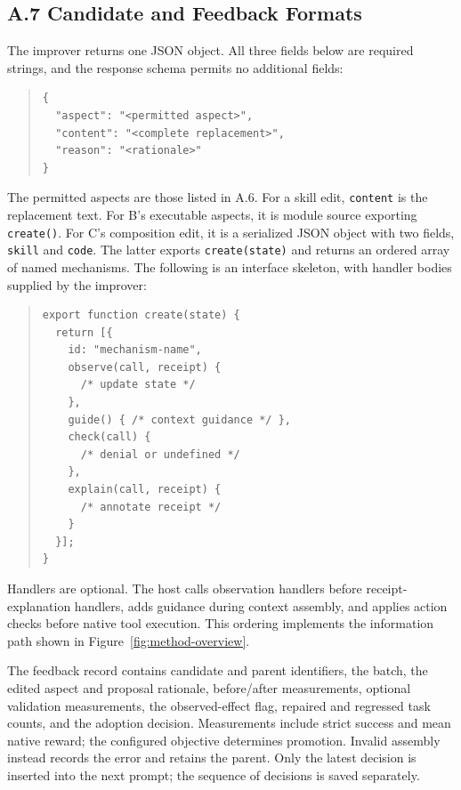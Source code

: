 \subsection*{A.7 Candidate and Feedback Formats}
The improver returns one JSON object. All three fields below are required strings, and the response schema permits no additional fields:
\begin{quote}\small
\begin{verbatim}
{
  "aspect": "<permitted aspect>",
  "content": "<complete replacement>",
  "reason": "<rationale>"
}
\end{verbatim}
\end{quote}
The permitted aspects are those listed in A.6. For a skill edit, \texttt{content} is the replacement text. For B's executable aspects, it is module source exporting \texttt{create()}. For C's composition edit, it is a serialized JSON object with two fields, \texttt{skill} and \texttt{code}. The latter exports \texttt{create(state)} and returns an ordered array of named mechanisms. The following is an interface skeleton, with handler bodies supplied by the improver:
\begin{quote}\small
\begin{verbatim}
export function create(state) {
  return [{
    id: "mechanism-name",
    observe(call, receipt) {
      /* update state */
    },
    guide() { /* context guidance */ },
    check(call) {
      /* denial or undefined */
    },
    explain(call, receipt) {
      /* annotate receipt */
    }
  }];
}
\end{verbatim}
\end{quote}
Handlers are optional. The host calls observation handlers before receipt-explanation handlers, adds guidance during context assembly, and applies action checks before native tool execution. This ordering implements the information path shown in Figure~\ref{fig:method-overview}.

The feedback record contains candidate and parent identifiers, the batch, the edited aspect and proposal rationale, before/after measurements, optional validation measurements, the observed-effect flag, repaired and regressed task counts, and the adoption decision. Measurements include strict success and mean native reward; the configured objective determines promotion. Invalid assembly instead records the error and retains the parent. Only the latest decision is inserted into the next prompt; the sequence of decisions is saved separately.
